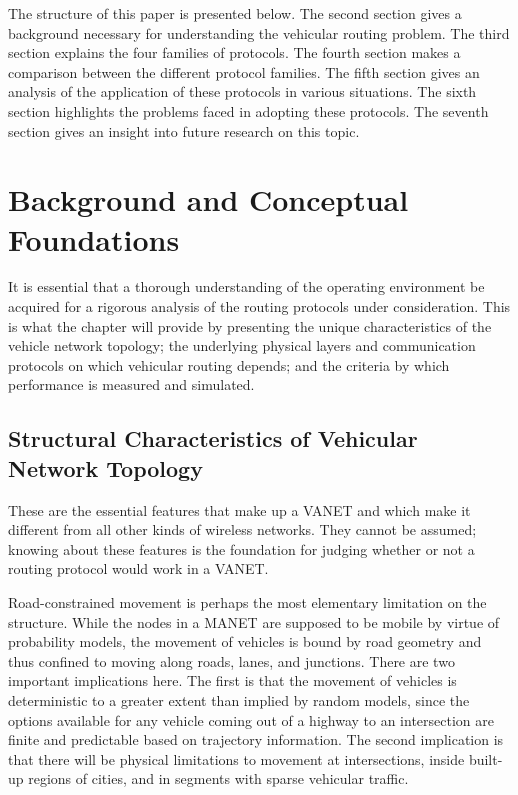 \documentclass[12pt]{article}
\begin{document}
The structure of this paper is presented below. The second section gives a background necessary for understanding the vehicular routing problem. The third section explains the four families of protocols. The fourth section makes a comparison between the different protocol families. The fifth section gives an analysis of the application of these protocols in various situations. The sixth section highlights the problems faced in adopting these protocols. The seventh section gives an insight into future research on this topic.

\section{Background and Conceptual Foundations}

It is essential that a thorough understanding of the operating environment be acquired for a rigorous analysis of the routing protocols under consideration. This is what the chapter will provide by presenting the unique characteristics of the vehicle network topology; the underlying physical layers and communication protocols on which vehicular routing depends; and the criteria by which performance is measured and simulated.

\subsection{Structural Characteristics of Vehicular Network Topology}

These are the essential features that make up a VANET and which make it different from all other kinds of wireless networks. They cannot be assumed; knowing about these features is the foundation for judging whether or not a routing protocol would work in a VANET.

Road-constrained movement is perhaps the most elementary limitation on the structure. While the nodes in a MANET are supposed to be mobile by virtue of probability models, the movement of vehicles is bound by road geometry and thus confined to moving along roads, lanes, and junctions. There are two important implications here. The first is that the movement of vehicles is deterministic to a greater extent than implied by random models, since the options available for any vehicle coming out of a highway to an intersection are finite and predictable based on trajectory information. The second implication is that there will be physical limitations to movement at intersections, inside built-up regions of cities, and in segments with sparse vehicular traffic.
\end{document}
